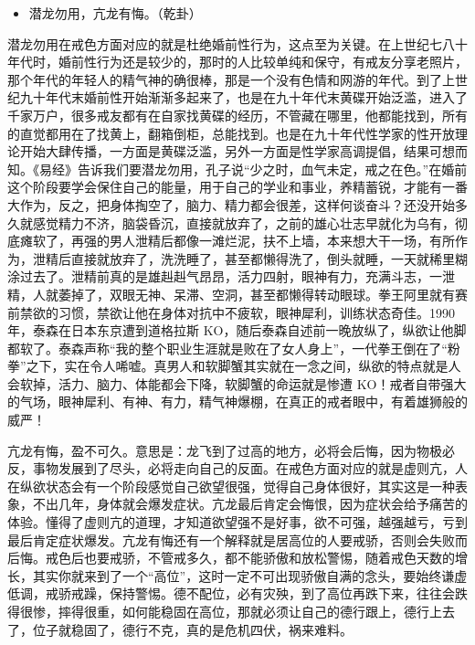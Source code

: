 \begin{itemize}\it
    \item 潜龙勿用，亢龙有悔。（乾卦）
\end{itemize}

潜龙勿用在戒色方面对应的就是杜绝婚前性行为，这点至为关键。在上世纪七八十年代时，婚前性行为还是较少的，那时的人比较单纯和保守，有戒友分享老照片，那个年代的年轻人的精气神的确很棒，那是一个没有色情和网游的年代。到了上世纪九十年代末婚前性开始渐渐多起来了，也是在九十年代末黄碟开始泛滥，进入了千家万户，很多戒友都有在自家找黄碟的经历，不管藏在哪里，他都能找到，所有的直觉都用在了找黄上，翻箱倒柜，总能找到。也是在九十年代性学家的性开放理论开始大肆传播，一方面是黄碟泛滥，另外一方面是性学家高调提倡，结果可想而知。《易经》告诉我们要潜龙勿用，孔子说“少之时，血气未定，戒之在色。”在婚前这个阶段要学会保住自己的能量，用于自己的学业和事业，养精蓄锐，才能有一番大作为，反之，把身体掏空了，脑力、精力都会很差，这样何谈奋斗？还没开始多久就感觉精力不济，脑袋昏沉，直接就放弃了，之前的雄心壮志早就化为乌有，彻底瘫软了，再强的男人泄精后都像一滩烂泥，扶不上墙，本来想大干一场，有所作为，泄精后直接就放弃了，洗洗睡了，甚至都懒得洗了，倒头就睡，一天就稀里糊涂过去了。泄精前真的是雄赳赳气昂昂，活力四射，眼神有力，充满斗志，一泄精，人就萎掉了，双眼无神、呆滞、空洞，甚至都懒得转动眼球。拳王阿里就有赛前禁欲的习惯，禁欲让他在身体对抗中不疲软，眼神犀利，训练状态奇佳。1990 年，泰森在日本东京遭到道格拉斯 KO，随后泰森自述前一晚放纵了，纵欲让他脚都软了。泰森声称“我的整个职业生涯就是败在了女人身上”，一代拳王倒在了“粉拳”之下，实在令人唏嘘。真男人和软脚蟹其实就在一念之间，纵欲的特点就是人会软掉，活力、脑力、体能都会下降，软脚蟹的命运就是惨遭 KO！戒者自带强大的气场，眼神犀利、有神、有力，精气神爆棚，在真正的戒者眼中，有着雄狮般的威严！

亢龙有悔，盈不可久。意思是：龙飞到了过高的地方，必将会后悔，因为物极必反，事物发展到了尽头，必将走向自己的反面。在戒色方面对应的就是虚则亢，人在纵欲状态会有一个阶段感觉自己欲望很强，觉得自己身体很好，其实这是一种表象，不出几年，身体就会爆发症状。亢龙最后肯定会悔恨，因为症状会给予痛苦的体验。懂得了虚则亢的道理，才知道欲望强不是好事，欲不可强，越强越亏，亏到最后肯定症状爆发。亢龙有悔还有一个解释就是居高位的人要戒骄，否则会失败而后悔。戒色后也要戒骄，不管戒多久，都不能骄傲和放松警惕，随着戒色天数的增长，其实你就来到了一个“高位”，这时一定不可出现骄傲自满的念头，要始终谦虚低调，戒骄戒躁，保持警惕。德不配位，必有灾殃，到了高位再跌下来，往往会跌得很惨，摔得很重，如何能稳固在高位，那就必须让自己的德行跟上，德行上去了，位子就稳固了，德行不克，真的是危机四伏，祸来难料。

